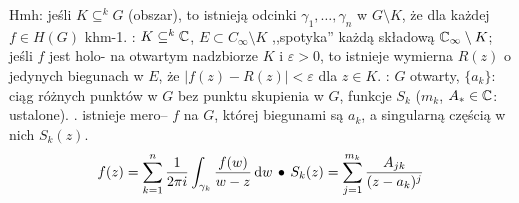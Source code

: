 Hmh:  jeśli $K \subseteq^k G$ (obszar), to istnieją odcinki $\gamma_1, \dots, \gamma_n$ w $G \setminus K$, że dla każdej $f \in H(G)$ khm-1.
: $K \subseteq^k \mathbb{C}$, $E \subset C_\infty \setminus K$ ,,spotyka'' każdą składową $\mathbb{C}_\infty \setminus K$; jeśli $f$ jest holo- na otwartym nadzbiorze $K$ i $\varepsilon > 0$, to istnieje wymierna $R(z)$ o jedynych biegunach w $E$, że $|f(z) - R(z)| < \varepsilon$ dla $z \in K$.
: $G$ otwarty, $\{a_k\}$: ciąg różnych punktów w $G$ bez punktu skupienia w $G$, funkcje $S_k$ ($m_k$, $A_* \in \mathbb{C}$: ustalone).
. istnieje mero-- $f$ na $G$, której biegunami są $a_k$, a singularną częścią w nich $S_k(z)$.
\[
	f(z) = \sum_{k=1}^n \frac{1}{2\pi i} \int_{\gamma_k} \frac{f(w)}{w-z} \,\textrm{d} w \, \bullet \,
	S_k(z) = \sum_{j=1}^{m_k} \frac{A_{jk}}{(z-a_k)^j}
\]